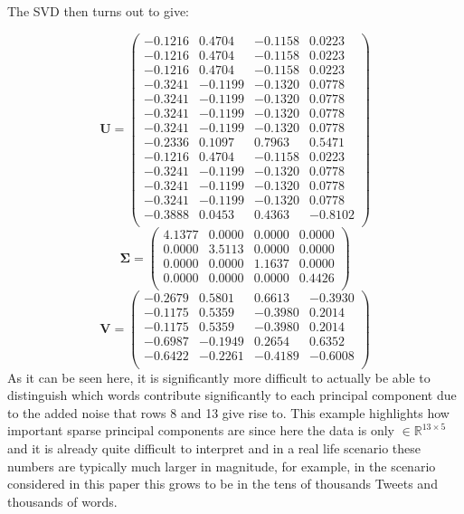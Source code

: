 \documentclass[11pt,a4paper]{article}
\begin{document}
The SVD then turns out to give:


\begin{equation*}
\mathbf{U}=
\begin{pmatrix}
-0.1216&0.4704&-0.1158&0.0223\\
-0.1216&0.4704&-0.1158&0.0223\\
-0.1216&0.4704&-0.1158&0.0223\\
-0.3241&-0.1199&-0.1320&0.0778\\
-0.3241&-0.1199&-0.1320&0.0778\\
-0.3241&-0.1199&-0.1320&0.0778\\
-0.3241&-0.1199&-0.1320&0.0778\\
-0.2336&0.1097&0.7963&0.5471\\
-0.1216&0.4704&-0.1158&0.0223\\
-0.3241&-0.1199&-0.1320&0.0778\\
-0.3241&-0.1199&-0.1320&0.0778\\
-0.3241&-0.1199&-0.1320&0.0778\\
-0.3888&0.0453&0.4363&-0.8102\\
\end{pmatrix}
\end{equation*}
\begin{equation*}
\mathbf{\Sigma}=
\begin{pmatrix}
4.1377&0.0000&0.0000&0.0000\\
0.0000&3.5113&0.0000&0.0000\\
0.0000&0.0000&1.1637&0.0000\\
0.0000&0.0000&0.0000&0.4426\\
\end{pmatrix}
\end{equation*}
\begin{equation*}
\mathbf{V}=
\begin{pmatrix}
-0.2679&0.5801&0.6613&-0.3930\\
-0.1175&0.5359&-0.3980&0.2014\\
-0.1175&0.5359&-0.3980&0.2014\\
-0.6987&-0.1949&0.2654&0.6352\\
-0.6422&-0.2261&-0.4189&-0.6008\\
\end{pmatrix}
\end{equation*}
As it can be seen here, it is significantly more difficult to actually be able to distinguish which words contribute significantly to each principal component due to the added noise that rows 8 and 13 give rise to. This example highlights how important sparse principal components are since here the data is only $\in \mathbb{R}^{13 \times 5}$ and it is already quite difficult to interpret and in a real life scenario these numbers are typically much larger in magnitude, for example, in the scenario considered in this paper this grows to be in the tens of thousands Tweets and thousands of words.
\end{document}
